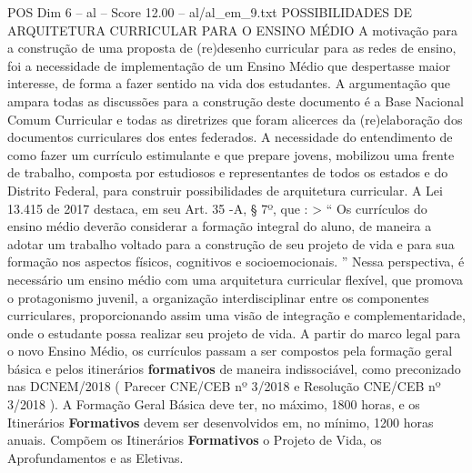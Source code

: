 \begin{textsample}{POS Dim 6 – al – Score 12.00 – al/al\_em\_9.txt}  \label{ex:f6_pos_221}
POSSIBILIDADES DE ARQUITETURA CURRICULAR PARA O ENSINO MÉDIO A motivação para a construção de uma proposta de (re)desenho curricular para as redes de ensino, foi a necessidade de implementação de um Ensino Médio que despertasse maior interesse, de forma a fazer sentido na vida dos estudantes.
A argumentação que ampara todas as discussões para a construção deste documento é a Base Nacional Comum Curricular e todas as diretrizes que foram alicerces da (re)elaboração dos documentos curriculares dos entes federados.
A necessidade do entendimento de como fazer um currículo estimulante e que prepare jovens, mobilizou uma frente de trabalho, composta por estudiosos e representantes de todos os estados e do Distrito Federal, para construir possibilidades de arquitetura curricular.
A Lei 13.415 de 2017 destaca, em seu Art. 35 -A, § 7º, que : > “ Os currículos do ensino médio deverão considerar a formação integral do aluno, de maneira a adotar um trabalho voltado para a construção de seu projeto de vida e para sua formação nos aspectos físicos, cognitivos e socioemocionais. ” Nessa perspectiva, é necessário um ensino médio com uma arquitetura curricular flexível, que promova o protagonismo juvenil, a organização interdisciplinar entre os componentes curriculares, proporcionando assim uma visão de integração e complementaridade, onde o estudante possa realizar seu projeto de vida.
A partir do marco legal para o novo Ensino Médio, os currículos passam a ser compostos pela formação geral básica e pelos itinerários \textbf{formativos} de maneira indissociável, como preconizado nas DCNEM/2018 ( Parecer CNE/CEB nº 3/2018 e Resolução CNE/CEB nº 3/2018 ).
A Formação Geral Básica deve ter, no máximo, 1800 horas, e os Itinerários \textbf{Formativos} devem ser desenvolvidos em, no mínimo, 1200 horas anuais.
Compõem os Itinerários \textbf{Formativos} o Projeto de Vida, os Aprofundamentos e as Eletivas.

\end{textsample}
